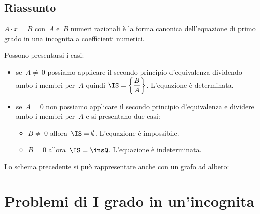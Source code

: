 
\subsection{Riassunto}
\(A\cdot x=B\) con~\(A\) e~\(B\) numeri
razionali è la forma canonica dell'equazione di primo grado in una
incognita a coefficienti numerici.%

Possono presentarsi i casi:
\begin{itemize} [nosep]
 \item se~\(A\neq~0\) possiamo applicare il secondo principio
d'equivalenza dividendo ambo i membri per~\(A\) quindi
\(\IS =\left\{\dfrac{B}{A}\right\}\). L'equazione è determinata.
 \item se~\(A=0\) non possiamo applicare il secondo principio
d'equivalenza e dividere ambo i membri per~\(A\) e si
presentano due casi:
\begin{itemize} [nosep]
\item \(B\neq~0\) allora~\(\IS =\emptyset \). L'equazione è impossibile.
 \item \(B=0\) allora~\(\IS =\insQ\). L'equazione è indeterminata.
\end{itemize}
\end{itemize}

Lo schema precedente si può rappresentare anche con un grafo ad
albero:
\begin{center}
%  
\alberoequazioni
\end{center}





\section{Problemi di I grado in un'incognita}
\label{sec:equazioni_problemi}

